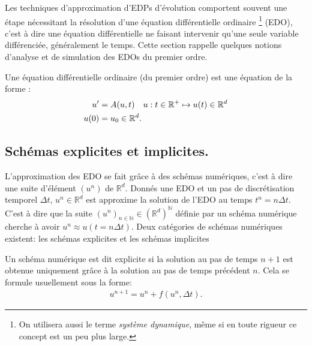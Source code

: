 Les techniques d'approximation d'EDPs d'évolution comportent souvent une étape nécessitant la résolution d'une équation différentielle ordinaire
\footnote{On utilisera aussi le terme \textit{système dynamique}, même si en toute rigueur ce concept est un peu plus large.} (EDO),
c'est à dire une équation différentielle ne faisant intervenir qu'une seule variable différenciée, généralement le temps. Cette section rappelle 
quelques notions d'analyse et de simulation des EDOs du premier ordre.\par

\begin{definition}
    Une équation différentielle ordinaire (du premier ordre) est une équation de la forme :
    \begin{align}\label{def:def_ODE}
        u' &= A(u,t)\quad u : t \in \mathbb{R}^+ \mapsto u(t) \in \mathbb{R}^d\\\notag
        u(0)&=u_0 \in \mathbb{R}^d.
    \end{align}
\end{definition}
\subsection{Schémas explicites et implicites.}
L'approximation des EDO se fait grâce à des schémas numériques, c'est à dire une suite d'élément $(u^n)$ de $\mathbb{R}^d$.
Donnés une EDO et un pas de discrétisation temporel $\Delta t$, $u^n \in \mathbb{R}^d$ est approxime la solution de l'EDO au temps $t^n = n \Delta t$.
C'est à dire que la suite $(u^n)_{n\in \mathbb{N}} \in (\mathbb R^d)^\mathbb{N}$ définie par un schéma numérique cherche à avoir $u^n \approx u(t=n\Delta t)$.
Deux catégories de schémas numériques existent: les schémas explicites et les schémas implicites


\begin{definition}
    Un schéma numérique est dit explicite si la solution au pas de temps $n+1$ est obtenue uniquement grâce à la solution au pas de temps précédent $n$. Cela se formule usuellement sous la forme:
    \begin{align}
        u^{n+1} = u^n + f(u^n ,\Delta t ).
    \end{align}
\end{definition}

